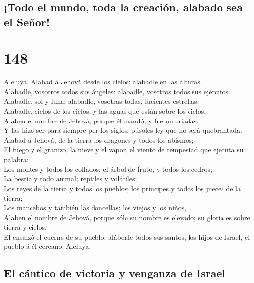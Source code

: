 \hypertarget{todo-el-mundo-toda-la-creaciuxf3n-alabado-sea-el-seuxf1or}{%
\subsection{¡Todo el mundo, toda la creación, alabado sea el
Señor!}\label{todo-el-mundo-toda-la-creaciuxf3n-alabado-sea-el-seuxf1or}}

\hypertarget{section-19-148}{%
\section{148}\label{section-19-148}}

 Aleluya. Alabad á Jehová desde los cielos: alabadle en
las alturas.\\
 Alabadle, vosotros todos sus ángeles: alabadle, vosotros
todos sus ejércitos.\\
 Alabadle, sol y luna: alabadle, vosotras todas, lucientes
estrellas.\\
 Alabadle, cielos de los cielos, y las aguas que están
sobre los cielos.\\
 Alaben el nombre de Jehová; porque él mandó, y fueron
criadas.\\
 Y las hizo ser para siempre por los siglos; púsoles ley
que no será quebrantada.\\
 Alabad á Jehová, de la tierra los dragones y todos los
abismos;\\
 El fuego y el granizo, la nieve y el vapor, el viento de
tempestad que ejecuta su palabra;\\
 Los montes y todos los collados; el árbol de fruto, y
todos los cedros;\\
 La bestia y todo animal; reptiles y volátiles;\\
 Los reyes de la tierra y todos los pueblos; los
príncipes y todos los jueces de la tierra;\\
 Los mancebos y también las doncellas; los viejos y los
niños,\\
 Alaben el nombre de Jehová, porque sólo su nombre es
elevado; su gloria es sobre tierra y cielos.\\
 El ensalzó el cuerno de su pueblo; alábenle todos sus
santos, los hijos de Israel, el pueblo á él cercano. Aleluya.

\hypertarget{el-cuxe1ntico-de-victoria-y-venganza-de-israel}{%
\subsection{El cántico de victoria y venganza de
Israel}\label{el-cuxe1ntico-de-victoria-y-venganza-de-israel}}

